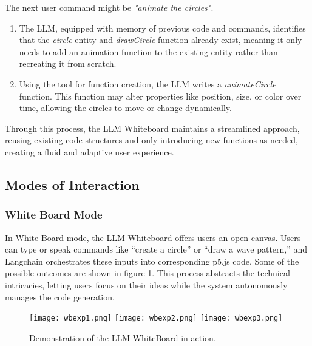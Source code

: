 The next user command might be \emph{"animate the circles"}.

\begin{enumerate}
    \item The LLM, equipped with memory of previous code and commands, identifies that the \textit{circle} entity and \textit{drawCircle} function already exist, meaning it only needs to add an animation function to the existing entity rather than recreating it from scratch.
    
    \item Using the tool for function creation, the LLM writes a \textit{animateCircle} function.
    This function may alter properties like position, size, or color over time, allowing the circles to move or change dynamically.
    
\end{enumerate}

Through this process, the LLM Whiteboard maintains a streamlined approach, reusing existing code structures and only introducing new functions as needed, creating a fluid and adaptive user experience.

\subsection{Modes of Interaction}

\subsubsection{White Board Mode}

In White Board mode, the LLM Whiteboard offers users an open canvas. %
Users can type or speak commands like “create a circle” or “draw a wave pattern,” and Langchain orchestrates these inputs into corresponding p5.js code.%
Some of the possible outcomes are shown in figure \ref{fig:wbdemo1}.
This process abstracts the technical intricacies, letting users focus on their ideas while the system autonomously manages the code generation.

\begin{figure}[h!]
    \centering
    \texttt{[image: wbexp1.png]}
    \texttt{[image: wbexp2.png]}
    \texttt{[image: wbexp3.png]}
    \caption{Demonstration of the LLM WhiteBoard in action.}
    \vspace{0.1cm}
    \label{fig:wbdemo1}
\end{figure}

